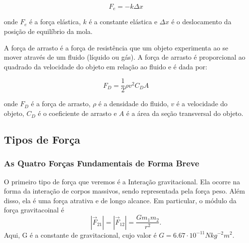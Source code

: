 \documentclass[PhysicsI/physics_notes.tex]{subfiles}
\begin{document}
\begin{equation}
	F_e = -k \Delta x
\end{equation}

onde $F_e$ é a força elástica, $k$ é a constante elástica e $\Delta x$ é o deslocamento da posição de equilíbrio da mola.
\begin{center}
\end{center}

A força de arrasto é a força de resistência que um objeto experimenta ao se mover através de um fluido (líquido ou gás). A força de arrasto é proporcional ao quadrado da velocidade do objeto em relação ao fluido e é dada por:

\begin{equation}
	F_D = \frac{1}{2} \rho v^2 C_D A
\end{equation}

onde $F_D$ é a força de arrasto, $\rho$ é a densidade do fluido, $v$ é a velocidade do objeto, $C_D$ é o coeficiente de arrasto e $A$ é a área da seção transversal do objeto.

\begin{center}
\end{center}

\subsection{Tipos de Força}
\subsubsection{As Quatro Forças Fundamentais de Forma Breve}
O primeiro tipo de força que veremos é a Interação gravitacional. Ela ocorre na forma da interação de corpos massivos,
sendo representada pela força peso. Além disso, ela é uma força atrativa e de longo alcance. Em particular, o módulo da
força gravitacoinal é
$$
	|\vec{F}_{21}| = |\vec{F}_{12}| = \frac{Gm_{1}m_{2}}{r^{2}}.
$$
Aqui, G é a constante de gravitacional, cujo valor é $G=6.67 \cdot 10^{-11}Nkg^{-2}m^{2}.$
\end{document}
